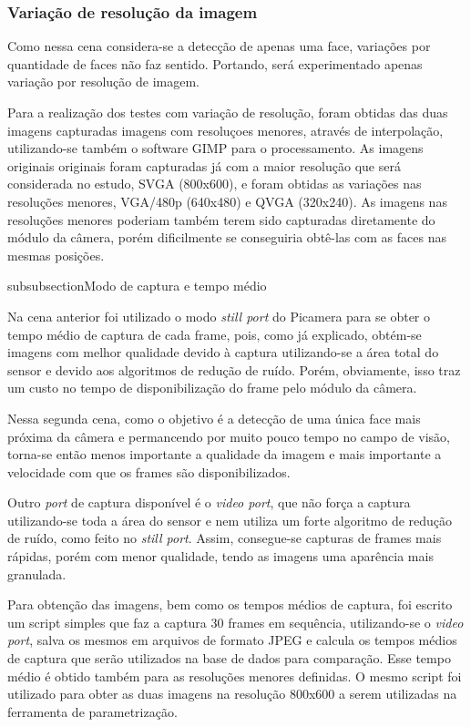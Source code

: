 \subsubsection{Variação de resolução da imagem}

Como nessa cena considera-se a detecção de apenas uma face, variações por quantidade de faces não faz sentido. Portando, será experimentado apenas variação por resolução de imagem. 

Para a realização dos testes com variação de resolução, foram obtidas das duas imagens capturadas imagens com resoluçoes menores, através de interpolação, utilizando-se também o software GIMP para o processamento. As imagens originais originais foram capturadas já com a maior resolução que será considerada no estudo, SVGA (800x600), e foram obtidas as variações nas resoluções menores, VGA/480p (640x480) e QVGA (320x240). As imagens nas resoluções menores poderiam também terem sido capturadas diretamente do módulo da câmera, porém dificilmente se conseguiria obtê-las com as faces nas mesmas posições.

subsubsection{Modo de captura e tempo médio}

Na cena anterior foi utilizado o modo \emph{still port} do Picamera para se obter o tempo médio de captura de cada frame, pois, como já explicado, obtém-se imagens com melhor qualidade devido à captura utilizando-se a área total do sensor e devido aos algoritmos de redução de ruído. Porém, obviamente, isso traz um custo no tempo de disponibilização do frame pelo módulo da câmera.

Nessa segunda cena, como o objetivo é a detecção de uma única face mais próxima da câmera e permancendo por muito pouco tempo no campo de visão, torna-se então menos importante a qualidade da imagem e mais importante a velocidade com que os frames são disponibilizados.

Outro \emph{port} de captura disponível é o \emph{video port}, que não força a captura utilizando-se toda a área do sensor e nem utiliza um forte algoritmo de redução de ruído, como feito no \emph{still port}. Assim, consegue-se capturas de frames mais rápidas, porém com menor qualidade, tendo as imagens uma aparência mais granulada. 

Para obtenção das imagens, bem como os tempos médios de captura, foi escrito um script simples que faz a captura 30 frames em sequência, utilizando-se o \emph{video port}, salva os mesmos em arquivos de formato JPEG e calcula os tempos médios de captura que serão utilizados na base de dados para comparação. Esse tempo médio é obtido também para as resoluções menores definidas. O mesmo script foi utilizado para obter as duas imagens na resolução 800x600 a serem utilizadas na ferramenta de parametrização. 


